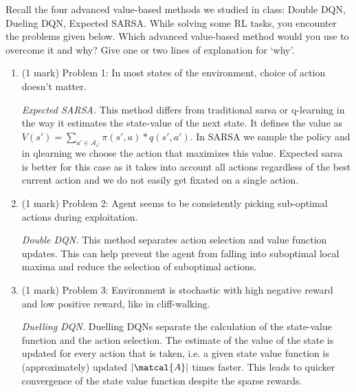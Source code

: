 \documentclass[addpoints,12pt,solution]{exam}
\begin{document}
    \begin{questions}

        \question[3] Recall the four advanced value-based methods we studied in class: Double DQN, Dueling DQN, Expected SARSA.
        While solving some RL tasks, you encounter the problems given below. Which advanced value-based method would you use to overcome it and why? Give one or two lines of explanation for `why’.
        \begin{enumerate}[label=(\alph*)]
            \item (1 mark) Problem 1: In most states of the environment, choice of action doesn’t matter.
            \begin{solution}
                \emph{Expected SARSA.} This method differs from traditional sarsa or q-learning in the way it estimates the state-value of the next state.
                It defines the value as $V(s') = \sum_{a'\in\mathcal{A_{s'}}}\pi(s', a) * q(s', a')$.
                In SARSA we sample the policy and in qlearning we choose the action that maximizes this value.
                Expected sarsa is better for this case as it takes into account all actions regardless of the best current action and we do not easily get fixated on a single action.

            \end{solution}
            \item (1 mark) Problem 2: Agent seems to be consistently picking sub-optimal actions during exploitation.
            \begin{solution}
                \emph{Double DQN.} This method separates action selection and value function updates.
                This can help prevent the agent from falling into suboptimal local maxima and reduce the selection of
                suboptimal actions.
            \end{solution}
            \item (1 mark) Problem 3: Environment is stochastic with high negative reward and low positive reward, like in cliff-walking.
            \begin{solution}
                \emph{Duelling DQN.} Duelling DQNs separate the calculation of the state-value function and
                the action selection. The estimate of the value of the state is updated for every action that is taken,
                i.e. a given state value function is (approximately) updated $|\matcal{A}|$ times faster.
                This leads to quicker convergence of the state value function despite the sparse rewards.
            \end{solution}
        \end{enumerate}



\end{questions}
\end{document}
